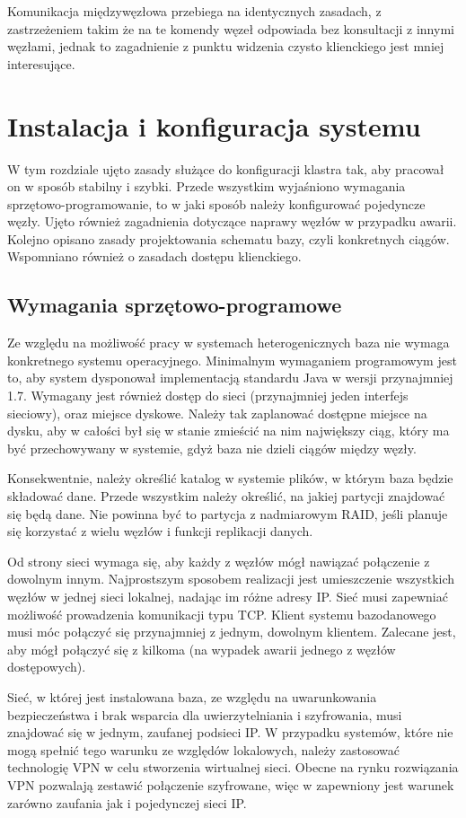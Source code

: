 \documentclass[a4paper,polish,12pt,twoside]{article}
\def \docsection#1{\clearpage\section{#1}}
\begin{document}
Komunikacja międzywęzłowa przebiega na identycznych zasadach, z zastrzeżeniem takim że na te komendy węzeł odpowiada bez konsultacji z innymi węzłami, jednak to zagadnienie z punktu widzenia czysto klienckiego jest mniej interesujące.

	\docsection{Instalacja i konfiguracja systemu}  \label{sec:system_service}
	W tym rozdziale ujęto zasady służące do konfiguracji klastra tak, aby pracował on w sposób stabilny i szybki. Przede wszystkim wyjaśniono wymagania sprzętowo-programowanie, to w jaki sposób należy konfigurować pojedyncze węzły. Ujęto również zagadnienia dotyczące naprawy węzłów w przypadku awarii. Kolejno opisano zasady projektowania schematu bazy, czyli konkretnych ciągów. Wspomniano również o zasadach dostępu klienckiego.

		\subsection{Wymagania sprzętowo-programowe}
Ze względu na możliwość pracy w systemach heterogenicznych baza nie wymaga konkretnego systemu operacyjnego. Minimalnym wymaganiem programowym jest to, aby system dysponował implementacją standardu Java w wersji przynajmniej 1.7. Wymagany jest również dostęp do sieci (przynajmniej jeden interfejs sieciowy), oraz miejsce dyskowe. Należy tak zaplanować dostępne miejsce na dysku, aby w całości był się w stanie zmieścić na nim największy ciąg, który ma być przechowywany w systemie, gdyż baza nie dzieli ciągów między węzły.

Konsekwentnie, należy określić katalog w systemie plików, w którym baza będzie składować dane. Przede wszystkim należy określić, na jakiej partycji znajdować się będą dane. Nie powinna być to partycja z nadmiarowym RAID, jeśli planuje się korzystać z wielu węzłów i funkcji replikacji danych.

Od strony sieci wymaga się, aby każdy z węzłów mógł nawiązać połączenie z dowolnym innym. Najprostszym sposobem realizacji jest umieszczenie wszystkich węzłów w jednej sieci lokalnej, nadając im różne adresy IP. Sieć musi zapewniać możliwość prowadzenia komunikacji typu TCP. Klient systemu bazodanowego musi móc połączyć się przynajmniej z jednym, dowolnym klientem. Zalecane jest, aby mógł połączyć się z kilkoma (na wypadek awarii jednego z węzłów dostępowych).

Sieć, w której jest instalowana baza, ze względu na uwarunkowania bezpieczeństwa i brak wsparcia dla uwierzytelniania i szyfrowania, musi znajdować się w jednym, zaufanej podsieci IP. W przypadku systemów, które nie mogą spełnić tego warunku ze względów lokalowych, należy zastosować technologię VPN w celu stworzenia wirtualnej sieci. Obecne na rynku rozwiązania VPN pozwalają zestawić połączenie szyfrowane, więc w zapewniony jest warunek zarówno zaufania jak i pojedynczej sieci IP.
\end{document}
